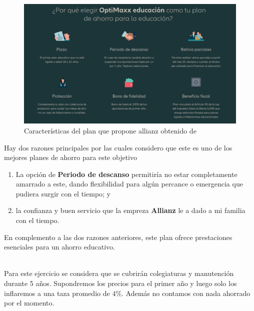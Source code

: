 \documentclass[11pt]{article}
\title{\titulo}
\author{ Universidad Virtual del Estado de Guanajuato \textbf{UVEG} \\ 
\materia \\ Benjamín Rivera \\ 19015478 }
\date{\textit{Fecha de entrega:} \today}
\begin{document}
	\maketitle
	
	\begin{figure}[htp]
		\centering
		\includegraphics[width=\textwidth]{assets/R2_U1-plan_allianz.png}
		\caption{Características del plan que propone allianz obtenido de \cite{plan}}
		\label{plan}
	\end{figure}
	
	\par Hay dos razones principales por las cuales considero que este es uno de los mejores planes de ahorro para este objetivo
	
	\begin{enumerate}
		\item La opción de \textbf{ Periodo de descanso } permitiría no estar completamente amarrado a este, dando flexibilidad para algún percance o emergencia que pudiera surgir con el tiempo; y
		\item la confianza y buen servicio que la empreza \textbf{ Allianz } le a dado a mi familia con el tiempo.
	\end{enumerate}
	
	\noindent En complemento a las dos razones anteriores, este plan ofrece prestaciones esenciales para un ahorro educativo.
	\\\ \\
	\par Para este ejercicio se considera que se cubrirán colegiaturas y manutención durante 5 años. Supondremos los precios para el primer año y luego solo los inflaremos a una taza promedio de $4\%$. Además no contamos con nada ahorrado por el momento.
	
\end{document}
